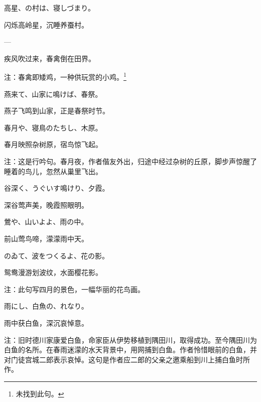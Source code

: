 \begin{haiku}
    {\FH 高星、の村は、寝しづまり。}

    {\FK 闪烁高岭星，沉睡养蚕村。}
\end{haiku}

\begin{haiku}
    {\FH ---}

    {\FK 疾风吹过来，春禽倒在田界。}

    {\FT 注：春禽即矮鸡，一种供玩赏的小鸡。\footnote{\FT 未找到此句。}}
\end{haiku}

\begin{haiku}
    {\FH 燕来て、山家に鳴けば、春祭。}

    {\FK 燕子飞鸣到山家，正是春祭时节。}
\end{haiku}

\begin{haiku}
    {\FH 春月や、寝鳥のたちし、木原。}

    {\FK 春月映照杂树原，宿鸟惊飞起。}

    {\FT 注：这是行吟句。春月夜，作者偕友外出，归途中经过杂树的丘原，脚步声惊醒了睡着的鸟儿，忽然从巢里飞出。}
\end{haiku}

\begin{haiku}
    {\FH 谷深く、うぐいす鳴けり、夕霞。}

    {\FK 深谷莺声美，晚霞照眼明。}
\end{haiku}

\begin{haiku}
    {\FH 鶯や、山いよよ、雨の中。}

    {\FK 前山莺鸟啼，濛濛雨中天。}
\end{haiku}

\begin{haiku}
    {\FH {}のゐて、波をつくるよ、花の影。}

    {\FK 鸳鸯漫游划波纹，水面樱花影。}

    {\FT 注：此句写四月的景色，一幅华丽的花鸟画。}
\end{haiku}

\begin{haiku}
    {\FH 雨にし、白魚の、れなり。}

    {\FK 雨中获白鱼，深沉哀悼意。}

    {\FT 注：旧时德川家康爱白鱼，命家臣从伊势移植到隅田川，取得成功。至今隅田川为白鱼的名所。在春雨迷濛的水天背景中，用网捕到白鱼。作者怜惜眼前的白鱼，并对门徒宫城二郎表示哀悼。这句是作者应二郎的父亲之邀乘船到川上捕白鱼时所作。}
\end{haiku}

